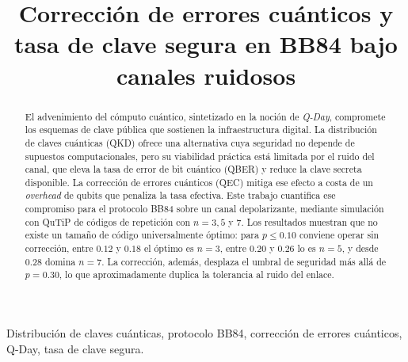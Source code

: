 \documentclass[conference]{IEEEtran}
\begin{document}
\title{Corrección de errores cuánticos y tasa de clave segura en BB84 bajo canales ruidosos}

\author{
}

\maketitle

\begin{abstract}
El advenimiento del cómputo cuántico, sintetizado en la noción de \textit{Q-Day},
compromete los esquemas de clave pública que sostienen la infraestructura
digital. La distribución de claves cuánticas (QKD) ofrece una alternativa cuya
seguridad no depende de supuestos computacionales, pero su viabilidad práctica
está limitada por el ruido del canal, que eleva la tasa de error de bit cuántico
(QBER) y reduce la clave secreta disponible. La corrección de errores cuánticos
(QEC) mitiga ese efecto a costa de un \textit{overhead} de qubits que penaliza la
tasa efectiva. Este trabajo cuantifica ese compromiso para el protocolo BB84
sobre un canal depolarizante, mediante simulación con QuTiP de códigos de
repetición con $n = 3, 5$ y $7$. Los resultados muestran que no existe un tamaño
de código universalmente óptimo: para $p \leq 0.10$ conviene operar sin
corrección, entre $0.12$ y $0.18$ el óptimo es $n = 3$, entre $0.20$ y $0.26$ lo
es $n = 5$, y desde $0.28$ domina $n = 7$. La corrección, además, desplaza el
umbral de seguridad más allá de $p = 0.30$, lo que aproximadamente duplica la
tolerancia al ruido del enlace.
\end{abstract}

\begin{IEEEkeywords}
Distribución de claves cuánticas, protocolo BB84, corrección de errores
cuánticos, Q-Day, tasa de clave segura.
\end{IEEEkeywords}

\end{document}
